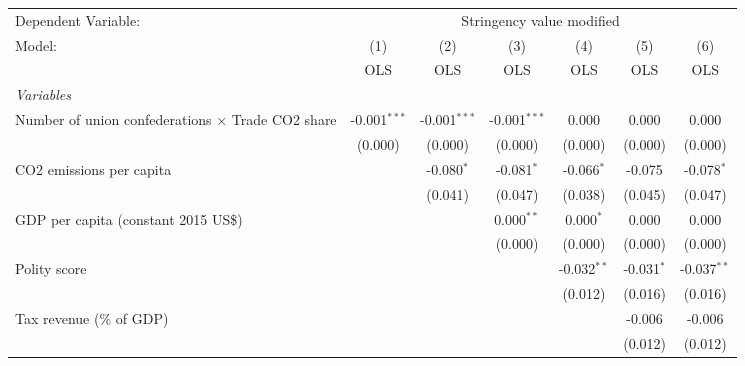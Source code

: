 
\begingroup
\centering
\begin{tabular}{lcccccc}
   \toprule
   Dependent Variable: & \multicolumn{6}{c}{Stringency value modified}\\
   Model:                                                   & (1)            & (2)            & (3)            & (4)           & (5)          & (6)\\  
                                                            &  OLS           & OLS            & OLS            & OLS           & OLS          & OLS\\  
   \midrule
   \emph{Variables}\\
   Number of union confederations $\times$ Trade CO2 share  & -0.001$^{***}$ & -0.001$^{***}$ & -0.001$^{***}$ & 0.000         & 0.000        & 0.000\\   
                                                            & (0.000)        & (0.000)        & (0.000)        & (0.000)       & (0.000)      & (0.000)\\   
   CO2 emissions per capita                                 &                & -0.080$^{*}$   & -0.081$^{*}$   & -0.066$^{*}$  & -0.075       & -0.078$^{*}$\\   
                                                            &                & (0.041)        & (0.047)        & (0.038)       & (0.045)      & (0.047)\\   
   GDP per capita (constant 2015 US\$)                      &                &                & 0.000$^{**}$   & 0.000$^{*}$   & 0.000        & 0.000\\   
                                                            &                &                & (0.000)        & (0.000)       & (0.000)      & (0.000)\\   
   Polity score                                             &                &                &                & -0.032$^{**}$ & -0.031$^{*}$ & -0.037$^{**}$\\   
                                                            &                &                &                & (0.012)       & (0.016)      & (0.016)\\   
   Tax revenue (\% of GDP)                                  &                &                &                &               & -0.006       & -0.006\\   
                                                            &                &                &                &               & (0.012)      & (0.012)\\   

\end{tabular}
